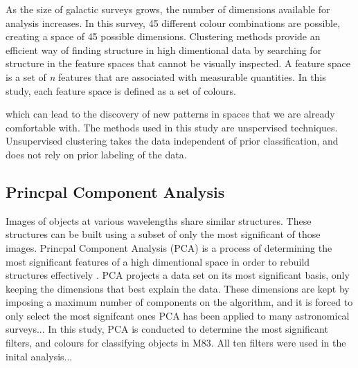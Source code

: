 As the size of galactic surveys grows, the number of dimensions available for analysis increases.
In this survey, 45 different colour combinations are possible, creating a space of 45 possible dimensions. 
Clustering methods provide an efficient way of finding structure in high dimentional data by searching for structure in the feature spaces that cannot be visually inspected. 
A feature space is a set of \textit{n} features that are associated with measurable quantities. 
In this study, each feature space is defined as a set of colours.

which can lead to the discovery of new patterns in spaces that we are already comfortable with. 
The methods used in this study are unspervised techniques. Unsupervised clustering takes the data independent of prior classification, and does not rely on prior labeling of the data.

\subsection{Princpal Component Analysis}
Images of objects at various wavelengths share similar structures. These structures can be built using a subset of only the most significant of those images.  
Princpal Component Analysis (PCA) is a process of determining the most significant features of a high dimentional space in order to rebuild structures effectively \citet{kuntzer16}.
PCA projects a data set on its most significant basis, only keeping the dimensions that best explain the data. 
These dimensions are kept by imposing a maximum number of components on the algorithm, and it is forced to only select the most signifcant ones \citet{kuntzer16}
PCA has been applied to many astronomical surveys... %
In this study, PCA is conducted to determine the most significant filters, and colours for classifying objects in M83.
All ten filters were used in the inital analysis... %



